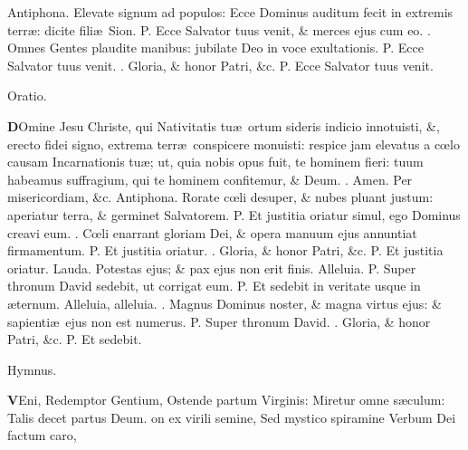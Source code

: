 \documentclass[letter,11pt]{book}
\makeatletter
\DeclareRobustCommand{\Vbar}{\vers@resp{-0.1em}{V}}
\DeclareRobustCommand{\Rbar}{\vers@resp{0pt}{R}}
\newcommand{\vers@resp@sym}{\raisebox{0.2ex}{\rotatebox[origin=c]{-20}{$\m@th\rceil$}}}
\newcommand{\vers@resp}[2]{%
  {\ooalign{\hidewidth\kern#1\vers@resp@sym\hidewidth\cr#2\cr}}%
}%
\def\P{\color{Red} P. \color{black}}
\def\V{\color{Red} \Vbar . \color{black}}
\def\R{\color{Red} \Rbar . \color{black}}
\makeatother
\begin{document}
\begin{multicols*}{2}
\newline \color{Red} Antiphona. \color{black} Elevate signum ad populos: Ecce Dominus auditum fecit in extremis terr\ae : dicite fili\ae \ Sion. \P Ecce Salvator tuus venit, \& merces ejus cum eo. \V Omnes Gentes plaudite manibus: jubilate Deo in voce exultationis. \P Ecce Salvator tuus venit. \V Gloria, \& honor Patri, \&c. \P Ecce Salvator tuus venit.
\vspace{-.5em} \begin{center} \color{Red} Oratio. \color{black} \end{center} \vspace{-.5em}
\lettrine[lines=2]{\bfseries \color{Red} D}{}Omine Jesu Christe, qui Nativitatis tu\ae \ ortum sideris indicio innotuisti, \&, erecto fidei signo, extrema terr\ae \ conspicere monuisti: respice jam elevatus a c\oe lo causam Incarnationis tu\ae ; ut, quia nobis opus fuit, te hominem fieri: tuum habeamus suffragium, qui te hominem confitemur, \& Deum. \R Amen. Per misericordiam, \&c.
\newline \color{Red} Antiphona. \color{black} Rorate c\oe li desuper, \& nubes pluant justum: aperiatur terra, \& germinet Salvatorem. \P Et justitia oriatur simul, ego Dominus creavi eum. \V C\oe li enarrant gloriam Dei, \& opera manuum ejus annuntiat firmamentum. \P Et justitia oriatur. \V Gloria, \& honor Patri, \&c. \P Et justitia oriatur.
\newline \color{Red} Lauda. \color{black} Potestas ejus; \& pax ejus non erit finis. Alleluia. \P Super thronum David sedebit, ut corrigat eum. \P Et sedebit in veritate usque in \ae ternum. Alleluia, alleluia. \V Magnus Dominus noster, \& magna virtus ejus: \& sapienti\ae \ ejus non est numerus. \P Super thronum David. \V Gloria, \& honor Patri, \&c. \P Et sedebit.
\vspace{-.5em} \begin{center} \color{Red} Hymnus. \color{black} \end{center} \vspace{-.5em}
\lettrine[lines=2]{\bfseries \color{Red} V}{}Eni, Redemptor Gentium,
\newline Ostende partum Virginis:
\newline \indent Miretur omne s\ae culum:
\newline \indent Talis decet partus Deum.
on ex virili semine,
\newline \indent Sed mystico spiramine
\newline \indent Verbum Dei factum caro,

\end{multicols*}
\end{document}
